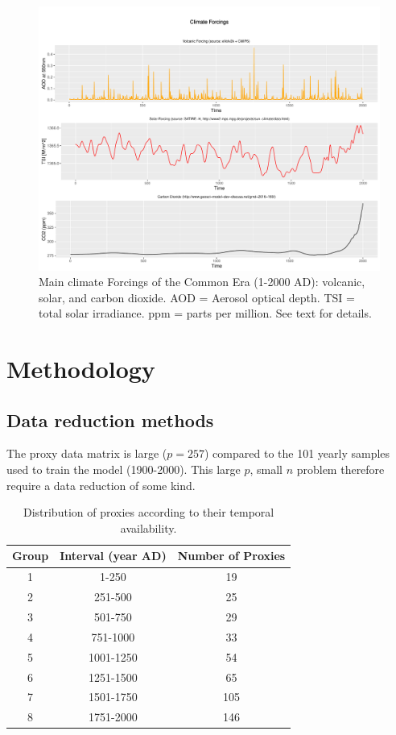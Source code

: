 \documentclass[12pt]{amsart}
\theoremstyle{plain}
\theoremstyle{definition}
\theoremstyle{remark}
\begin{document}
\begin{figure}
  \centering
  \includegraphics[scale=0.40]{forcings}
  \caption{Main climate Forcings of the Common Era (1-2000 AD): volcanic, solar, and carbon dioxide. AOD = Aerosol optical depth. TSI = total solar irradiance. ppm = parts per million. See text for details.}
  \label{fig:forcings}
\end{figure}

\section{Methodology}\label{sec:model}
\subsection{Data reduction methods}
\label{sec:rp}

The proxy data matrix is large ($p=257$) compared to the 101 yearly samples used to train the model (1900-2000). This large $p$, small $n$ problem therefore require  a data reduction of some kind. 

\begin{table}
  \centering
  \begin{tabular}{c|c|c}
    \toprule
    Group & Interval (year AD) & Number of Proxies\\
    \midrule
    1 & 1-250 & 19 \\
    2 & 251-500 & 25 \\
    3 & 501-750 & 29 \\
    4 & 751-1000 & 33 \\
    5 & 1001-1250 & 54 \\
    6 & 1251-1500 & 65 \\
    7 & 1501-1750 & 105 \\
    8 & 1751-2000 & 146 \\
    \bottomrule
  \end{tabular}
  \caption{Distribution of proxies according to their temporal availability.}
  \label{tab:distdate}
\end{table}
\end{document}
